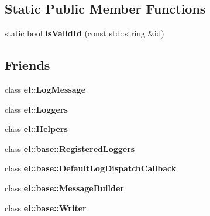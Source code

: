 \subsection*{Static Public Member Functions}
\begin{DoxyCompactItemize}
\item 
\hypertarget{classel_1_1Logger_af6cf4f266ceb65da9563afd3706f26d6}{static bool {\bfseries is\-Valid\-Id} (const std\-::string \&id)}\label{classel_1_1Logger_af6cf4f266ceb65da9563afd3706f26d6}

\end{DoxyCompactItemize}
\subsection*{Friends}
\begin{DoxyCompactItemize}
\item 
\hypertarget{classel_1_1Logger_a22965b691242a9f61d443ba03fce3e35}{class {\bfseries el\-::\-Log\-Message}}\label{classel_1_1Logger_a22965b691242a9f61d443ba03fce3e35}

\item 
\hypertarget{classel_1_1Logger_a6efe246b312d02731fb0e1d120c0331d}{class {\bfseries el\-::\-Loggers}}\label{classel_1_1Logger_a6efe246b312d02731fb0e1d120c0331d}

\item 
\hypertarget{classel_1_1Logger_a2fb8a2c02cbf86247f093c118bed877a}{class {\bfseries el\-::\-Helpers}}\label{classel_1_1Logger_a2fb8a2c02cbf86247f093c118bed877a}

\item 
\hypertarget{classel_1_1Logger_a574ecee25e8d578f76060a95a2fe7c9e}{class {\bfseries el\-::base\-::\-Registered\-Loggers}}\label{classel_1_1Logger_a574ecee25e8d578f76060a95a2fe7c9e}

\item 
\hypertarget{classel_1_1Logger_a42b1de96d584ae4fecbfc2b9aff95052}{class {\bfseries el\-::base\-::\-Default\-Log\-Dispatch\-Callback}}\label{classel_1_1Logger_a42b1de96d584ae4fecbfc2b9aff95052}

\item 
\hypertarget{classel_1_1Logger_a81bbf6fe31fab133d182efa8367304f1}{class {\bfseries el\-::base\-::\-Message\-Builder}}\label{classel_1_1Logger_a81bbf6fe31fab133d182efa8367304f1}

\item 
\hypertarget{classel_1_1Logger_a7a728edbb2761d151832daa74d5b2736}{class {\bfseries el\-::base\-::\-Writer}}\label{classel_1_1Logger_a7a728edbb2761d151832daa74d5b2736}


\end{DoxyCompactItemize}
